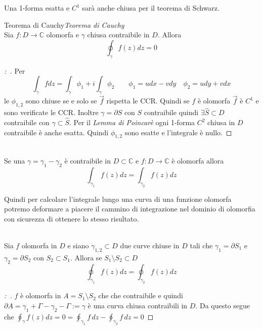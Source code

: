\documentclass[11pt,a4paper,twoside]{book}
\newenvironment{teorema}[1][\empty]{\begin{Teorema}{
\ifx\empty#1\relax\else\mdseries\itshape#1\\\fi
}{}}{\end{Teorema}}
\newenvironment{corollario}[1][\empty]{\begin{Corollario}{
\ifx\empty#1\relax\else\mdseries\itshape#1\\\fi
}{}}{\end{Corollario}}
\newenvironment{dimo}[1][\proofname]{
	\begin{tcolorbox}[
	breakable, 
	enhanced, 
	interior hidden, 
	frame hidden, 
	borderline west = {1pt}{0pt}{gray}, 
	top=0pt, bottom=0pt, left=0pt]
\begin{proof}[#1:~]
}
{
\end{proof}
\end{tcolorbox}
}
\theoremstyle{esss}
\theoremstyle{dotless}
\numberwithin{equation}{section} %
\begin{document}
Una 1-forma esatta e $C^1$ sarà anche chiusa per il teorema di Schwarz.
\begin{teorema}[Teorema di Cauchy]
Sia $f:D\rightarrow\mathbb{C}$ olomorfa e $\gamma$ chiusa contraibile in $D$. Allora
\[
\oint_\gamma f(z) dz =0
\]
\end{teorema}
\begin{dimo}
Per 
\[
\int_\gamma f dz = \int_\gamma \phi_1 + i\int_\gamma \phi_2 \qquad \phi_1 = u dx - vdy\quad\phi_2=udy+vdx
\]
le $\phi_{1,2}$ sono chiuse se e solo se $\vec{f}$ rispetta le CCR.
Quindi se $f$ è olomorfa $\vec{f}$ è $C^1$ e sono verificate le CCR. Inoltre 
$\gamma=\partial S$ con $S$ contraibile quindi $\exists \hat{S}\subset D$ contraibile con $\gamma\subset \hat{S}$.
Per il \textit{Lemma di Poincarè} ogni 1-forma $C^2$ chiusa in $D$ contraibile è anche esatta. 
Quindi $\phi_{1,2}$ sono esatte e l'integrale è nullo. \qedhere
\end{dimo}
\begin{corollario}
Se una $\gamma=\gamma_1-\gamma_2$ è contraibile in $D\subset\mathbb{C}$ e $f:D\rightarrow\mathbb{C}$ è olomorfa allora
\[
\int_{\gamma_1} f(z) dz = \int_{\gamma_2} f(z) dz
\]
\end{corollario}
Quindi per calcolare l'integrale lungo una curva di una funzione olomorfa potremo deformare a piacere il cammino di integrazione nel dominio di olomorfia con sicurezza di ottenere lo stesso risultato.

\begin{corollario}
Sia $f$ olomorfa in $D$ e siano $\gamma_{1,2}\subset D$ due curve chiuse in $D$ tali che $\gamma_1=\partial S_1$ e $\gamma_2=\partial S_2$ con $S_2\subset S_1$\footnotemark. Allora se $S_1\setminus S_2\subset D$ 
\[
\oint_{\gamma_1} f(z)dz = \oint_{\gamma_2} f(z) dz
\] 
\end{corollario}
\begin{dimo}
$f$ è olomorfa in $A=S_1\setminus S_2$ che che contraibile e quindi $\partial A=\gamma_1+\Gamma-\gamma_2-\Gamma:=\gamma$ è una curva chiusa contraibili in $D$. Da questo segue che $\oint_\gamma f(z)dz=0=\oint_{\gamma_1}f\,dz-\oint_{\gamma_2}f\,dz=0$ \qedhere
\end{dimo}
\end{document}
